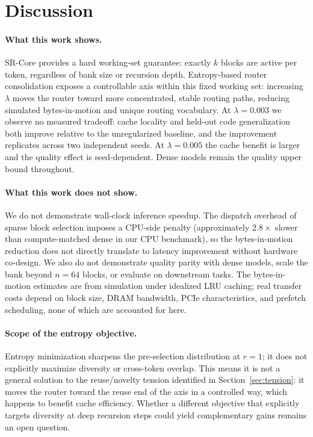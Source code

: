 \section{Discussion}
\label{sec:discussion}

\paragraph{What this work shows.}
SR-Core provides a hard working-set guarantee: exactly $k$ blocks are active per token,
regardless of bank size or recursion depth.
Entropy-based router consolidation exposes a controllable axis within this fixed working
set: increasing $\lambda$ moves the router toward more concentrated, stable routing paths,
reducing simulated bytes-in-motion and unique routing vocabulary.
At $\lambda = 0.003$ we observe no measured tradeoff: cache locality and held-out code
generalization both improve relative to the unregularized baseline, and the improvement
replicates across two independent seeds.
At $\lambda = 0.005$ the cache benefit is larger and the quality effect is seed-dependent.
Dense models remain the quality upper bound throughout.

\paragraph{What this work does not show.}
We do not demonstrate wall-clock inference speedup.
The dispatch overhead of sparse block selection imposes a CPU-side penalty (approximately
$2.8\times$ slower than compute-matched dense in our CPU benchmark), so the
bytes-in-motion reduction does not directly translate to latency improvement without
hardware co-design.
We also do not demonstrate quality parity with dense models, scale the bank beyond
$n = 64$ blocks, or evaluate on downstream tasks.
The bytes-in-motion estimates are from simulation under idealized LRU caching; real
transfer costs depend on block size, DRAM bandwidth, PCIe characteristics, and prefetch
scheduling, none of which are accounted for here.

\paragraph{Scope of the entropy objective.}
Entropy minimization sharpens the pre-selection distribution at $r = 1$; it does not
explicitly maximize diversity or cross-token overlap.
This means it is not a general solution to the reuse/novelty tension identified in
Section~\ref{sec:tension}: it moves the router toward the reuse end of the axis in a
controlled way, which happens to benefit cache efficiency.
Whether a different objective that explicitly targets diversity at deep recursion steps
could yield complementary gains remains an open question.

